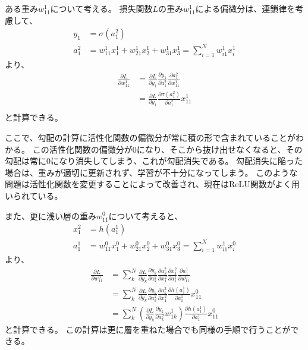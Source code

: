 ある重み$w^1_{11}$について考える。
損失関数$L$の重み$w^1_{11}$による偏微分は、連鎖律を考慮して、
\begin{equation}
 \begin{split}
  y_1 &= \sigma(a^2_1)\\
  a^2_1 &= w^1_{11} x^1_1 + w^1_{21} x^1_2 + w^1_{31} x^1_3 = \sum^N_{i=1} w^1_{i1} x^1_i
 \end{split}
\end{equation}
より、
\begin{equation}
 \begin{split}
  \frac{\partial L}{\partial w^1_{11}} 
  &= \frac{\partial L}{\partial y_1}\frac{\partial y_1}{\partial a^2_1}\frac{\partial a^2_1}{\partial w^1_{11}}\\
  &= \frac{\partial L}{\partial y_1}\frac{\partial \sigma(a^2_1)}{\partial a^2_1}x^1_{11}\\
 \end{split}
\end{equation}
と計算できる。

ここで、勾配の計算に活性化関数の偏微分が常に積の形で含まれていることがわかる。
この活性化関数の偏微分が0になり、そこから抜け出せなくなると、その勾配は常に0になり消失してしまう、これが勾配消失である。
勾配消失に陥った場合は、重みが適切に更新されず、学習が不十分になってしまう。
このような問題は活性化関数を変更することによって改善され、現在はReLU関数がよく用いられている。

また、更に浅い層の重み$w^0_{11}$について考えると、
\begin{equation}
 \begin{split}
  x^2_1 &= h(a^1_1)\\
  a^1_1 &= w^0_{11} x^0_1 + w^0_{21} x^0_2 + w^0_{31} x^0_3 = \sum^N_{i=1} w^1_{i1} x^0_i
 \end{split}
\end{equation}
より、
\begin{equation}
 \begin{split}
  \frac{\partial L}{\partial w^0_{11}} 
  &= \sum^N_{k} \frac{\partial L}{\partial y_k}\frac{\partial y_k}{\partial a^2_k}\frac{\partial a^2_k}{\partial x^2_1}\frac{\partial x^2_1}{\partial a^1_1}\frac{\partial a^1_1}{\partial w^0_{11}}\\
  &= \sum^N_{k} \frac{\partial L}{\partial y_k}\frac{\partial y_k}{\partial a^2_k}\frac{\partial a^2_k}{\partial x^2_1}\frac{\partial h(a^1_1)}{\partial a^1_1}x^0_{11}\\
  &= \sum^N_{k} \left(\frac{\partial L}{\partial y_k}\frac{\partial y_k}{\partial a^2_k}w^1_{1k}\right)\frac{\partial h(a^1_1)}{\partial a^1_1}x^0_{11}
 \end{split}
\end{equation}
と計算できる。
この計算は更に層を重ねた場合でも同様の手順で行うことができる。

